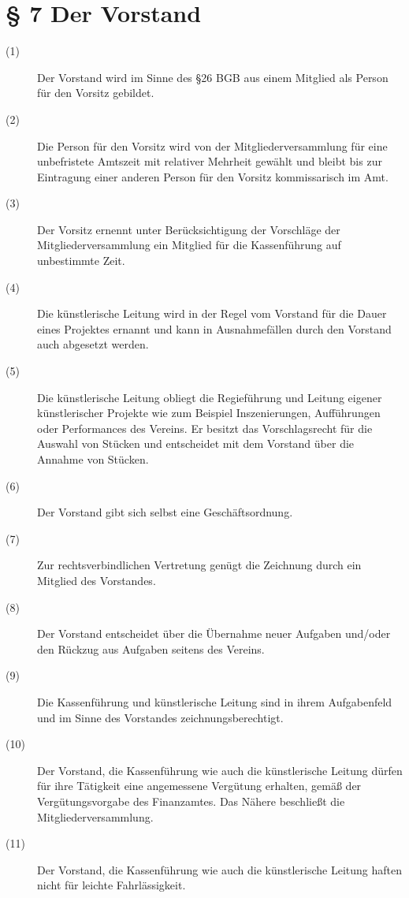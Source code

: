 \documentclass[a4paper,12pt]{scrartcl}
\begin{document}
\section*{\S{} 7 Der Vorstand}
\begin{description} 

\item[(1)] Der Vorstand wird im Sinne des §26 BGB aus einem Mitglied als Person für den Vorsitz gebildet.
\item[(2)] Die Person für den Vorsitz wird von der Mitgliederversammlung für eine unbefristete Amtszeit mit relativer Mehrheit gewählt und bleibt bis zur Eintragung einer anderen Person für den Vorsitz kommissarisch im Amt.
\item[(3)] Der Vorsitz ernennt unter Berücksichtigung der Vorschläge der Mitgliederversammlung ein Mitglied für die Kassenführung auf unbestimmte Zeit.
\item[(4)] Die künstlerische Leitung wird in der Regel vom Vorstand für die Dauer eines Projektes ernannt und kann in Ausnahmefällen durch den Vorstand auch abgesetzt werden.
\item[(5)] Die künstlerische Leitung obliegt die Regieführung und Leitung eigener künstlerischer Projekte wie zum Beispiel Inszenierungen, Aufführungen oder Performances des Vereins. Er besitzt das Vorschlagsrecht für die Auswahl von Stücken und entscheidet mit dem Vorstand über die Annahme von Stücken.
\item[(6)] Der Vorstand gibt sich selbst eine Geschäftsordnung.
\item[(7)] Zur rechtsverbindlichen Vertretung genügt die Zeichnung durch ein Mitglied des Vorstandes.
\item[(8)] Der Vorstand entscheidet über die Übernahme neuer Aufgaben und/oder den Rückzug aus Aufgaben seitens des Vereins.
\item[(9)] Die Kassenführung und künstlerische Leitung sind in ihrem Aufgabenfeld und im Sinne des Vorstandes zeichnungsberechtigt.
\item[(10)] Der Vorstand, die Kassenführung wie auch die künstlerische Leitung dürfen für ihre Tätigkeit eine angemessene Vergütung erhalten, gemäß der Vergütungsvorgabe des Finanzamtes. Das Nähere beschließt die Mitgliederversammlung.
\item[(11)] Der Vorstand, die Kassenführung wie auch die künstlerische Leitung haften nicht für leichte Fahrlässigkeit.

\end{description}
\end{document}
